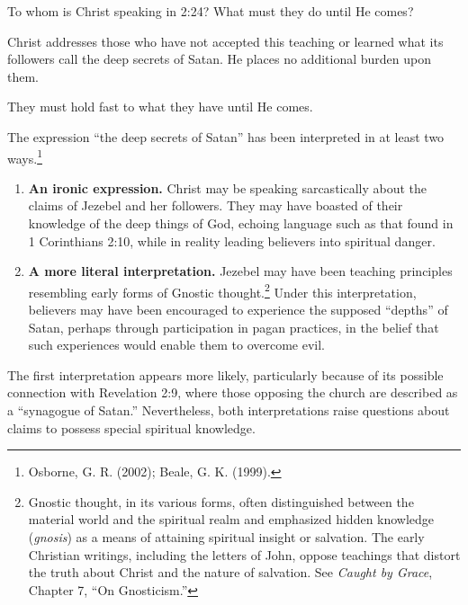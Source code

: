 \begin{ScriptureBox2}{To whom is Christ speaking in 2:24? What must they do until He comes?}
\item[2:24] Christ addresses those who have not accepted this teaching or learned what its followers call the deep secrets of Satan. He places no additional burden upon them.

\item[2:25] They must hold fast to what they have until He comes.
\end{ScriptureBox2}

The expression ``the deep secrets of Satan'' has been interpreted in at least two ways.\footnote{Osborne, G. R. (2002); Beale, G. K. (1999).}

\begin{enumerate}
\item \textbf{An ironic expression.} Christ may be speaking sarcastically about the claims of Jezebel and her followers. They may have boasted of their knowledge of the deep things of God, echoing language such as that found in 1 Corinthians 2:10, while in reality leading believers into spiritual danger.

\item \textbf{A more literal interpretation.} Jezebel may have been teaching principles resembling early forms of Gnostic thought.\footnote{Gnostic thought, in its various forms, often distinguished between the material world and the spiritual realm and emphasized hidden knowledge (\textit{gnosis}) as a means of attaining spiritual insight or salvation. The early Christian writings, including the letters of John, oppose teachings that distort the truth about Christ and the nature of salvation. See \textit{Caught by Grace}, Chapter 7, ``On Gnosticism.''} Under this interpretation, believers may have been encouraged to experience the supposed ``depths'' of Satan, perhaps through participation in pagan practices, in the belief that such experiences would enable them to overcome evil.
\end{enumerate}

The first interpretation appears more likely, particularly because of its possible connection with Revelation 2:9, where those opposing the church are described as a ``synagogue of Satan.'' Nevertheless, both interpretations raise questions about claims to possess special spiritual knowledge.

